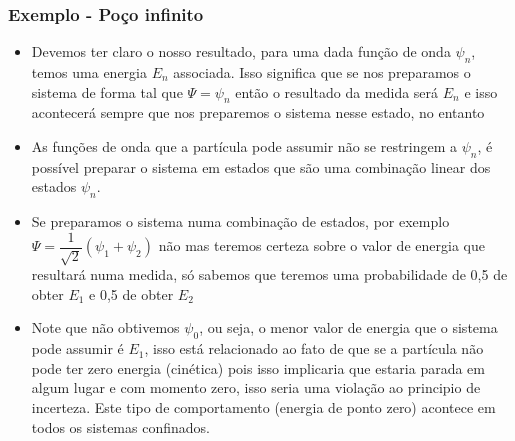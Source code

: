 \documentclass[12pt,brazil]{beamer}
\begin{document}
\begin{frame}
  \frametitle{Exemplo - Poço infinito}  
  \fontsize{9pt}{11pt}\selectfont
  
  \begin{itemize}
   \item Devemos ter claro o nosso resultado, para uma dada função de onda $\psi_n$, temos uma energia $E_n$ associada. Isso significa que se nos preparamos o sistema de forma tal que $\Psi = \psi_n$ então o resultado da medida será $E_n$ e isso acontecerá sempre que nos preparemos o sistema nesse estado, no entanto
   \item As funções de onda que a partícula pode assumir não se restringem a $\psi_n$, é possível preparar o sistema em estados que são uma combinação linear dos estados $\psi_n$.
   \item  Se preparamos o sistema numa combinação de estados, por exemplo  $\Psi = \dfrac{1}{\sqrt{2}}\left( \psi_1 + \psi_2\right)$ não mas teremos certeza sobre o valor de energia que resultará numa medida, só sabemos que teremos uma probabilidade de 0,5 de obter $E_1$ e 0,5 de obter $E_2$
   \item Note que não obtivemos $\psi_0$, ou seja, o menor valor de energia que o sistema pode assumir é $E_1$, isso está relacionado ao fato de que se a partícula não pode ter zero energia (cinética) pois isso implicaria que estaria parada em algum lugar e com momento zero, isso seria uma violação ao principio de incerteza. Este tipo de comportamento (energia de ponto zero) acontece em todos os sistemas confinados.
  \end{itemize}

  
\end{frame}
\end{document}
